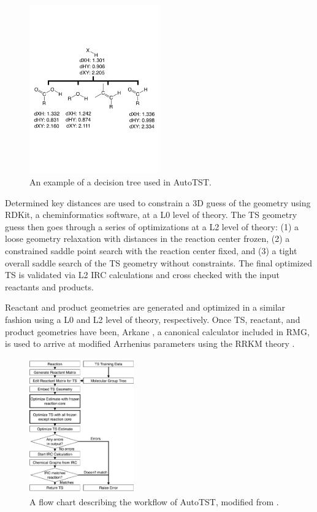 \documentclass[preprint, 11pt]{elsarticle} %
\begin{document}
\begin{figure}[htbp]
    \centering
    \includegraphics[width=0.5\textwidth]{autotst_tree}
    \caption{An example of a decision tree used in AutoTST.}
    \label{fig:autotst_tree}
\end{figure}

Determined key distances are used to constrain a 3D guess of the geometry using RDKit, a cheminformatics software, \cite{RDKit:2018} at a L0 level of theory.
The TS geometry guess then goes through a series of optimizations at a L2 level of theory: (1) a loose geometry relaxation with distances in the reaction center frozen, (2) a constrained saddle point search with the reaction center fixed, and (3) a tight overall saddle search of the TS geometry without constraints.
The final optimized TS is validated via L2 IRC calculations and cross checked with the input reactants and products.

Reactant and product geometries are generated and optimized in a similar fashion using a L0 and L2 level of theory, respectively. 
Once TS, reactant, and product geometries have been, Arkane \cite{gao:2016}, a canonical calculator included in RMG, is used to arrive at modified Arrhenius parameters using the RRKM theory \cite{RRKM:1999, RRKM:2015}.


\begin{figure}[htbp]
    \centering
    \includegraphics[width=0.4\textwidth]{autotst_overview}
    \caption{A flow chart describing the workflow of AutoTST, modified from \cite{bhoorasingh:2017}.}
    \label{fig:autotst_overview}
\end{figure}
\end{document}
